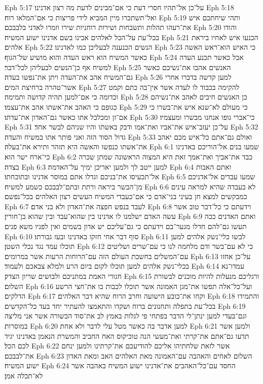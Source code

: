 Eph 5:17  על־כן אל־תהיו חסרי דעת כי אם־מבינים לדעת מה רצון אדנינו׃
Eph 5:18  ואל־תשתכרו מיין המביא לידי פריצות כי אם־המלאו רוח׃
Eph 5:19  ותהי שיחתכם איש את־רעהו תהלות ותשבחות ושירות רוחניות שירו וזמרו לאדני בלבבכם׃
Eph 5:20  והודו בכל־עת על־הכל לאלהים אבינו בשם אדנינו ישוע המשיח׃
Eph 5:21  הכנעו איש לאחיו ביראת אלהים׃
Eph 5:22  הנשים הכנענה לבעליכן כמו לאדנינו׃
Eph 5:23  כי האיש הוא־ראש האשה כאשר המשיח הוא ראש העדה והוא מושיע של־הגוף׃
Eph 5:24  אבל כאשר תכנע העדה למשיח אף כן־הנשים לבעליהן לכל־דבר׃
Eph 5:25  האנשים אהבו את־נשיכם כאשר גם־המשיח אהב את־העדה ויתן את־נפשו בעדה׃
Eph 5:26  למען קדשה בדברו אחרי אשר־טהרה ברחיצת המים׃
Eph 5:27  להקימה בכבוד לו לעדה אשר אין־בה כתם וקמט וכדומה כי אם־למען תהיה קדושה ותמימה׃
Eph 5:28  כן האנשים חיבים לאהב את־נשיהם כגופם כי האהב את־אשתו אהב את־עצמו׃
Eph 5:29  כי מעולם לא־שנא איש את־בשרו כי אם־זן ומכלכל אתו כאשר גם־האדון את־עדתו׃
Eph 5:30  כי־אברי גופו אנחנו מבשרו ומעצמיו׃
Eph 5:31  על־כן יעזב־איש את־אביו ואת־אמו ודבק באשתו והיו שניהם לבשר אחד׃
Eph 5:32  גדול הסוד הזה ואני פותר אתו במשיח והעדה׃
Eph 5:33  ואולם גם־אתם כל־איש מכם יאהב את־אשתו כנפשו והאשה היא תזהר ותירא את־בעלה׃
Eph 6:1  שמעו בנים אל־הוריכם באדנינו כי־ארח ישר הוא׃
Eph 6:2  כבד את־אביך ואת־אמך זאת היא המצוה הראשונה שמתן שכרה בצדה׃
Eph 6:3  למען ייטב לך ולמען יאריכן ימיך על־האדמה׃
Eph 6:4  ואתם האבות אל־תכעיסו את־בניכם וגדלו אתם במוסר אדנינו ובתוכחתו׃
Eph 6:5  שמעו עבדים אל־אדניכם מן־הבשר ביראה ורתת ובתם־לבבכם כשמע למשיח׃
Eph 6:6  לא בעבדה שהיא למראה עינים כמבקשים למצא חן בעיני בני־אדם כי אם־כעבדי המשיח העשים רצון האלהים בכל־נפשם׃
Eph 6:7  לעבד בנפש חפצה את־האדון ולא בני אדם׃
Eph 6:8  וידעתם כי כל־דבר טוב אשר עשה האדם ישלמנו לו אדנינו בין שהוא־עבד ובין שהוא בן־חורין׃
Eph 6:9  ואתם האדנים ככה תעשו גם־להם חדלו מגער־בם וידעתם כי גם־עליכם יש אדון בשמים ואין לפניו משא פנים׃
Eph 6:10  סוף דבר אחי חזקו באדנינו ובעז גבורתו׃
Eph 6:11  לבשו כלי־נשק אלהים למען תוכלו עמד נגד נכלי השטן׃
Eph 6:12  כי לא עם־בשר ודם מלחמה לנו כי עם־שרים ושליטים עם־המשלים בחשכת העולם הזה עם־הרוחות הרעות אשר במרומים׃
Eph 6:13  על־כן אחזו בכלי־נשק אלהים למען תוכלו לקום ביום הרע ולמלא צבאכם ולעמוד׃
Eph 6:14  עמדו־נא חגורי האמת במתניכם ולבושים שריון הצדק׃
Eph 6:15  ורגליכם מנעלות להיות מוכנים לבשורת השלום׃
Eph 6:16  ועל־כל־אלה תפשו את־מגן האמונה אשר תוכלו לכבות בו את־חצי הרשע הדלקים׃
Eph 6:17  וקחו את־כובע הישועה וחרב הרוח שהיא דבר האלהים׃
Eph 6:18  והתמידו בכל־עת בתפלה ותחנונים ברוח ושקדו והתאמצו להעתיר יחד בעד כל־הקדשים׃
Eph 6:19  וגם־בעדי למען ינתן־לי הדבר בפתחי פי לגלות באמץ לב את־סוד הבשורה אשר אני מליצה במוסרות׃
Eph 6:20  למען אדבר בה כאשר מטל עלי לדבר ולא אחת׃
Eph 6:21  ולמען אשר תדעו גם־אתם את־קרתי ואת־מעשי הנה טוכיקוס האח החביב והמשרת הנאמן באדנינו יגיד לכם הכל׃
Eph 6:22  אשר לזאת שלחתיהו אליכם להודיעכם את־קרתינו ולמען ינחם את־לבבכם׃
Eph 6:23  השלום לאחים והאהבה עם־האמונה מאת האלהים האב ומאת האדון ישוע המשיח׃
Eph 6:24  החסד עם־כל־האהבים את־אדנינו ישוע המשיח באהבה אשר לא־תכלה אמן׃


